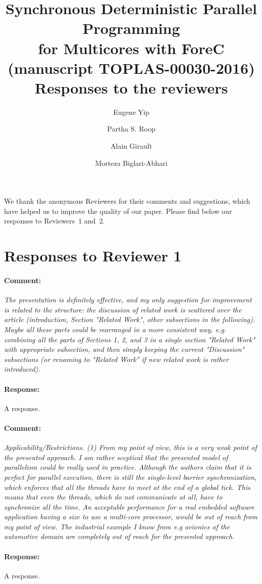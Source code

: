 \documentclass[a4paper,11pt]{article}
\title{
	Synchronous Deterministic Parallel Programming \\ for Multicores with ForeC \\
	{\large (manuscript TOPLAS-00030-2016) } \\[1ex]
	Responses to the reviewers
}
\author{Eugene Yip \and Partha S. Roop \and Alain Girault \and Morteza Biglari-Abhari}
\newenvironment{comment}{\paragraph{Comment:}\em}{}
\newenvironment{response}{\paragraph{Response:}}{}
\begin{document}
\maketitle

We thank the anonymous Reviewers for their comments and suggestions,
which have helped us to improve the quality of our paper. Please find
below our responses to Reviewers~1 and~2. 

\section{Responses to Reviewer 1}

\begin{comment}
	The presentation is definitely effective, and my only
	suggestion for improvement is related to the structure: the
	discussion of related work is scattered over the article
	(introduction, Section "Related Work", other subsections in
	the following). Maybe all these parts could be rearranged in
	a more consistent way, e.g. combining all the parts of
	Sections 1, 2, and 3 in a single section "Related Work" with
	appropriate subsection, and then simply keeping the current
	"Discussion" subsections (or renaming to "Related Work" if
	new related work is rather introduced).
\end{comment}
\begin{response}
	A response.
\end{response}

\begin{comment}
	Applicability/Restrictions. (1) From my point of view, this
	is a very weak point of the presented approach. I am rather
	sceptical that the presented model of parallelism could be
	really used in practice. Although the authors claim that it
	is perfect for parallel execution, there is still the
	single-level barrier synchronization, which enforces that
	all the threads have to meet at the end of a global tick.
	This means that even the threads, which do not communicate
	at all, have to synchronize all the time. An acceptable
	performance for a real embedded software application having
	a size to use a multi-core processor, would be out of reach
	from my point of view. The industrial example I know from
	e.g avionics of the automotive domain are completely out of
	reach for the presented approach.
\end{comment}
\begin{response}
	A response.
\end{response}
\end{document}
